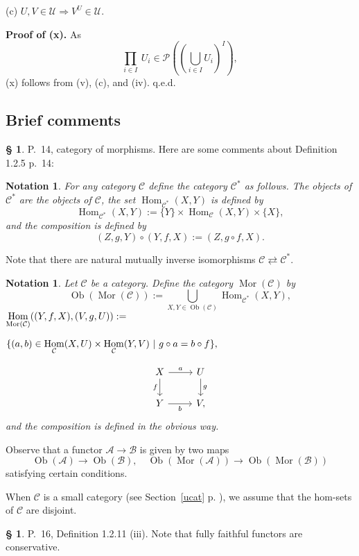 \documentclass[12pt]{article}
\newtheorem{nota}[thm]{Notation}
\theoremstyle{remark}
\theoremstyle{definition}
\newtheorem{s}[thm]{\S}
\newcommand{\nn}{\noindent}
\newcommand{\A}{\mathcal A}
\newcommand{\B}{\mathcal B}
\newcommand{\C}{\mathcal C}
\newcommand{\then}{\Rightarrow}
\DeclareMathOperator{\Hom}{Hom}
\DeclareMathOperator{\Mor}{Mor}
\DeclareMathOperator{\Ob}{Ob}
\begin{document}
(c) $U,V\in\mathcal U\then V^U\in\mathcal U$.

\nn\textbf{Proof of (x).} As 
$$
\prod_{i\in I}\ U_i\in\mathcal P\left(\left(\bigcup_{i\in I}U_i\right)^I\right),
$$
(x) follows from (v), (c), and (iv). q.e.d.


\subsection{Brief comments}

\begin{s}\label{d125}
P.~14, category of morphisms. Here are some comments about Definition 1.2.5 p.~14:

\begin{nota}\label{c*}
For any category $\C$ define the category $\C^*$\index{$\C^*$} as follows. The objects of $\C^*$ are the objects of $\C$, the set $\Hom_{\C^*}(X,Y)$ is defined by 
$$
\Hom_{\C^*}(X,Y):=\{Y\}\times\Hom_{\C}(X,Y)\times\{X\},
$$
and the composition is defined by 
$$
(Z,g,Y)\circ(Y,f,X):=(Z,g\circ f,X).
$$ 
\end{nota}

Note that there are natural mutually inverse isomorphisms $\C\rightleftarrows\C^*$. 

\begin{nota}\label{mor}
%
Let $\C$ be a category. Define the category $\Mor(\C)$ \index{$\Mor$} by 
$$
\Ob(\Mor(\C)):=\bigcup_{X,Y\in\Ob(\C)}\Hom_{\C^*}(X,Y),
$$
$\ds\Hom_{\Mor(\C)}((Y,f,X),(V,g,U)):=$\bigskip 

$\hfill\ds\{(a,b)\in\Hom_\C(X,U)\times\Hom_\C(Y,V)\ | \ g\circ a=b\circ f\},$\bigskip

\nn{\em i.e.} 
$$
\begin{tikzcd}
X\ar{d}[swap]{f}\ar{r}{a}&U\ar{d}{g}\\ 
Y\ar{r}[swap]{b}&V,
\end{tikzcd}
$$ 
and the composition is defined in the obvious way.
\end{nota}

Observe that a functor $\A\to\B$ is given by two maps 
$$
\Ob(\A)\to\Ob(\B),\quad\Ob(\Mor(\A))\to\Ob(\Mor(\B))
$$ 
satisfying certain conditions.

When $\C$ is a small category (see Section~\ref{ucat} p. \pageref{ucat}), we assume that the hom-sets of $\C$ are disjoint.
\end{s}

%

\begin{s}\label{ffc}
P.~16, Definition 1.2.11 (iii). Note that fully faithful functors are conservative. 
\end{s}
\end{document}
